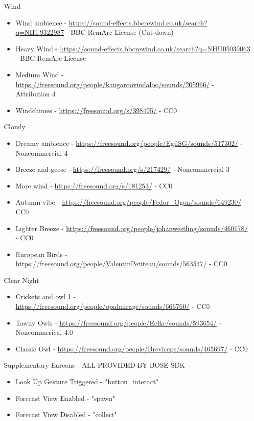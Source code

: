 \documentclass{l4proj}
\begin{document}
\begin{appendices}
Wind \begin{itemize}
    \item Wind ambience - \url{https://sound-effects.bbcrewind.co.uk/search?q=NHU9322987} - BBC RemArc License (Cut down)
    \item Heavy Wind - \url{https://sound-effects.bbcrewind.co.uk/search?q=NHU05039063} - BBC RemArc License
    \item Medium Wind - \url{https://freesound.org/people/kangaroovindaloo/sounds/205966/} - Attribution 4
    \item Windchimes - \url{https://freesound.org/s/398495/} - CC0
\end{itemize}


Cloudy \begin{itemize}
    \item Dreamy ambience - \url{https://freesound.org/people/EgilSG/sounds/517302/} - Noncommercial 4
    \item Breeze and geese - \url{https://freesound.org/s/217429/} - Noncommercial 3
    \item More wind - \url{https://freesound.org/s/181253/} - CC0
    \item Autumn vibe - \url{https://freesound.org/people/Fedor_Ogon/sounds/649230/} - CC0
    \item Lighter Breeze - \url{https://freesound.org/people/johanwestling/sounds/460178/} - CC0
    \item European Birds - \url{https://freesound.org/people/ValentinPetiteau/sounds/563547/} - CC0
\end{itemize}


Clear Night \begin{itemize}
    \item Crickets and owl 1 - \url{https://freesound.org/people/opalmirage/sounds/666760/} - CC0
    \item Tawny Owls - \url{https://freesound.org/people/Eelke/sounds/593654/} - Noncommerical 4.0
    \item Classic Owl - \url{https://freesound.org/people/Breviceps/sounds/465697/} - CC0
\end{itemize}

Supplementary Earcons - ALL PROVIDED BY BOSE SDK \begin{itemize}
    \item Look Up Gesture Triggered - "button\_interact"
    \item Forecast View Enabled - "spawn"
    \item Forecast View Disabled - "collect"
\end{itemize}





\end{appendices}
\end{document}
